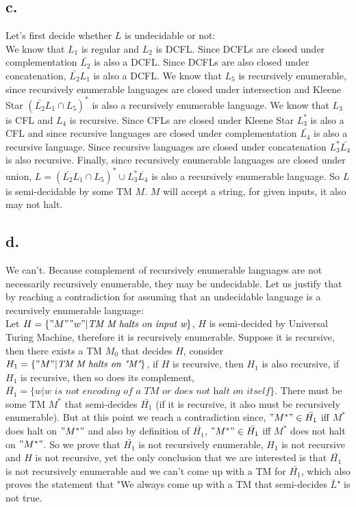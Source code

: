 \documentclass[12pt]{article}
\begin{document}
\subsection*{c.}
Let's first decide whether $L$ is undecidable or not: \\

We know that $L_1$ is regular and $L_2$ is DCFL. Since DCFLs are closed under complementation $\bar{L_2}$ is also a DCFL. Since DCFLs are also closed under concatenation, $\bar{L_2}L_1$ is also a DCFL. We know that $L_5$ is recursively enumerable, since recursively enumerable languages are closed under intersection and Kleene Star $(\bar{L_2}L_1 \cap L_5)^*$ is also a recursively enumerable language. We know that $L_3$ is CFL and $L_4$ is recursive. Since CFLs are closed under Kleene Star $L_3^*$ is also a CFL and since recursive languages are closed under complementation $\bar{L_4}$ is also a recursive language. Since recursive languages are closed under concatenation $L_3^*\bar{L_4}$ is also recursive. Finally, since recursively enumerable languages are closed under union, $L = (\bar{L_2}L_1 \cap L_5)^* \cup L_3^*\bar{L_4}$ is also a recursively enumerable language. So $L$ is semi-decidable by some TM $M$. $M$ will accept a string, for given inputs, it also may not halt.
\subsection*{d.}
We can't. Because complement of recursively enumerable languages are not necessarily recursively enumerable, they may be undecidable. Let us justify that by reaching a contradiction for assuming that an undecidable language is a recursively enumerable language: \\

Let $H = \{"M""w"|\textit{TM M halts on input w}\}$, $H$ is semi-decided by Universal Turing Machine, therefore it is recursively enumerable. Suppose it is recursive, then there exists a TM $M_0$ that decides $H$, consider $H_1 = \{"M"|\textit{TM M halts on "M"}\}$, if $H$ is recursive, then $H_1$ is also recursive, if $H_1$ is recursive, then so does its complement, $\bar{H_1}=\{w|\textit{w is not encoding of a TM or}$ $\textit{does not halt on itself}\}$. There must be some TM $M^*$ that semi-decides $\bar{H_1}$ (if it is recursive, it also must be recursively enumerable). But at this point we reach a contradiction since, $"M^*"\in \bar{H_1}$ iff $M^*$ does halt on $"M^*"$ and also by definition of $\bar{H_1}$, $"M^*"\in \bar{H_1}$ iff $M^*$ does not halt on $"M^*"$. So we prove that $\bar{H_1}$ is not recursively enumerable, $H_1$ is not recursive and $H$ is not recursive, yet the only conclusion that we are interested is that $\bar{H_1}$ is not recursively enumerable and we can't come up with a TM for $\bar{H_1}$, which also proves the statement that "We always come up with a TM that semi-decides $\bar{L}$" is not true.

\end{document}
